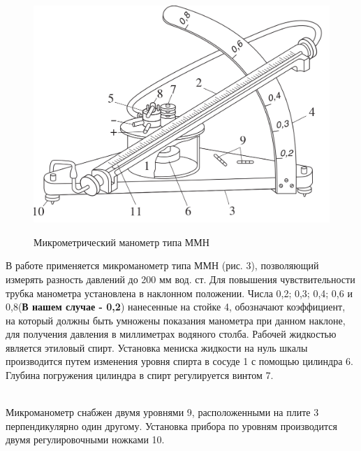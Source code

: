 \documentclass[a4paper,12pt]{article}
\theoremstyle{plain} %
\theoremstyle{definition} %
\theoremstyle{remark} %
\begin{document}
\begin{figure}
	\includegraphics[width=\linewidth]{pic3.png}\label{pic:Pic3}
	\caption{Микрометрический манометр типа ММН}
\end{figure}
В работе применяется микроманометр типа ММН (рис. 3), позволяющий измерять разность давлений до 200 мм вод. ст. Для повышения чувствительности трубка манометра установлена в наклонном положении. Числа 0,2; 0,3; 0,4; 0,6 и 0,8(\textbf{В нашем случае - 0,2}) нанесенные на стойке 4, обозначают коэффициент, на который должны быть умножены показания манометра при данном наклоне, для получения давления в миллиметрах водяного столба. Рабочей жидкостью является этиловый спирт. Установка мениска жидкости на нуль шкалы производится путем изменения уровня спирта в сосуде 1 с помощью цилиндра 6. Глубина погружения цилиндра в спирт регулируется винтом 7.\\[1ex]\

\indent Микроманометр снабжен двумя уровнями 9, расположенными на плите 3 перпендикулярно один другому. Установка прибора по уровням производится двумя регулировочными ножками 10.
\end{document}
